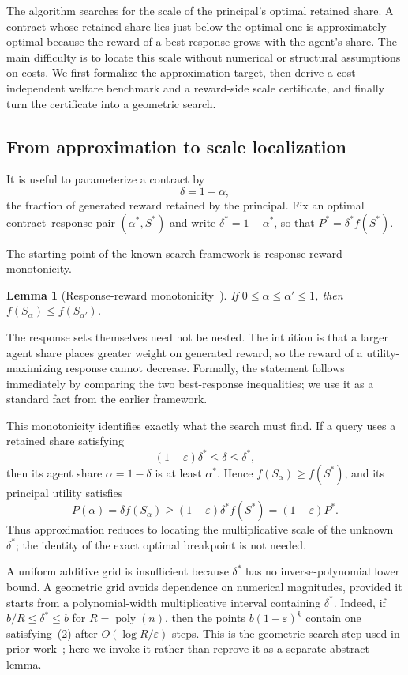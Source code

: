 \documentclass[11pt]{article}
\newtheorem{lemma}[lemma]{Lemma}
\newcommand{\eps}{\varepsilon}
\begin{document}
The algorithm searches for the scale of the principal's optimal retained
share.  A contract whose retained share lies just below the optimal one is
approximately optimal because the reward of a best response grows with the
agent's share.  The main difficulty is to locate this scale without numerical
or structural assumptions on costs.  We first formalize the approximation
target, then derive a cost-independent welfare benchmark and a reward-side
scale certificate, and finally turn the certificate into a geometric search.

\subsection{From approximation to scale localization}

It is useful to parameterize a contract by
\[
                         \delta=1-\alpha,
\]
the fraction of generated reward retained by the principal.  Fix an optimal
contract--response pair $(\alpha^*,S^*)$ and write
$\delta^*=1-\alpha^*$, so that $P^*=\delta^*f(S^*)$.

The starting point of the known search framework is response-reward
monotonicity.

\begin{lemma}[Response-reward monotonicity~\cite{DEFK21,DEFK25,DFGR26}]
\label{lem:monotone}
If $0\leq\alpha\leq\alpha'\leq1$, then
$f(S_\alpha)\leq f(S_{\alpha'})$.
\end{lemma}

The response sets themselves need not be nested.  The intuition is that a
larger agent share places greater weight on generated reward, so the reward
of a utility-maximizing response cannot decrease.  Formally, the statement
follows immediately by comparing the two best-response inequalities; we
use it as a standard fact from the earlier framework.

This monotonicity identifies exactly what the search must find.  If a query
uses a retained share satisfying
\[
                 (1-\eps)\delta^*\leq\delta\leq\delta^*, \tag{2}
\]
then its agent share $\alpha=1-\delta$ is at least $\alpha^*$.  Hence
$f(S_\alpha)\geq f(S^*)$, and its principal utility satisfies
\[
 P(\alpha)=\delta f(S_\alpha)
 \geq(1-\eps)\delta^*f(S^*)
 =(1-\eps)P^*.
\]
Thus approximation reduces to locating the multiplicative scale of the
unknown $\delta^*$; the identity of the exact optimal breakpoint is not
needed.

A uniform additive grid is insufficient because $\delta^*$ has no
inverse-polynomial lower bound.  A geometric grid avoids dependence on
numerical magnitudes, provided it starts from a polynomial-width
multiplicative interval containing $\delta^*$.  Indeed, if
$b/R\leq\delta^*\leq b$ for $R=\operatorname{poly}(n)$, then the points
$b(1-\eps)^k$ contain one satisfying~(2) after
$O(\log R/\eps)$ steps.  This is the geometric-search step used in prior
work~\cite{DEFK25,DFGR26}; here we invoke it rather than reprove it as a
separate abstract lemma.
\end{document}
